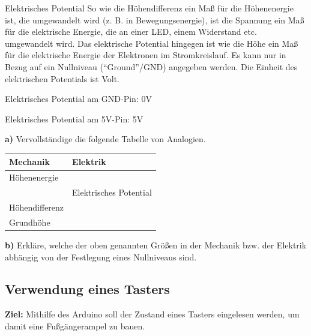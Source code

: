 \begin{zsfg}{Elektrisches Potential}
	So wie die Höhendifferenz ein Maß für die Höhenenergie ist, die umgewandelt wird (z. B. in Bewegungsenergie), ist die Spannung ein Maß für die elektrische Energie, die an einer LED, einem Widerstand etc. umgewandelt wird. Das elektrische Potential hingegen ist wie die Höhe ein Maß für die elektrische Energie der Elektronen im Stromkreislauf. Es kann nur in Bezug auf ein Nullniveau (\enquote{Ground}/GND) angegeben werden. Die Einheit des elektrischen Potentials ist Volt.
	
	Elektrisches Potential am GND-Pin: 0V
	
	Elektrisches Potential am 5V-Pin: 5V
\end{zsfg}

\newpage

\begin{aufgabe}
	
	\textbf{a)} Vervollständige die folgende Tabelle von Analogien.
	\begin{table}[H]
		\centering
		\begin{minipage}[c]{\textwidth}
			\begin{tabu} to \textwidth {X[C]|X[C]}
				\toprule
				\textbf{Mechanik} & \textbf{Elektrik} \\
				\toprule
				Höhenenergie \bigskip &  \\
				\midrule
				& Elektrisches Potential \bigskip \\
				\midrule
				Höhendifferenz \bigskip &  \\
				\midrule
				Grundhöhe \bigskip&  \\
				\bottomrule
			\end{tabu}
		\end{minipage}
		\label{tab:analogie-potential}
	\end{table}
	
	\textbf{b)} Erkläre, welche der oben genannten Größen in der Mechanik bzw. der Elektrik abhängig von der Festlegung eines Nullniveaus sind.
\end{aufgabe}

\newpage
\subsection{Verwendung eines Tasters}
\label{sec:taster}

\begin{ziel}
	\textbf{Ziel:} Mithilfe des Arduino soll der Zustand eines Tasters eingelesen werden, um damit eine Fußgängerampel zu bauen.
\end{ziel}

